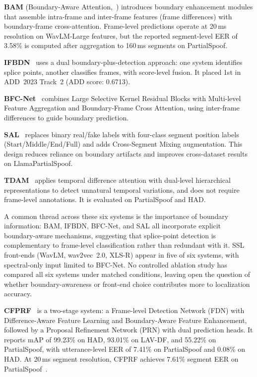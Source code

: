 \documentclass[journal]{IEEEtran}
\begin{document}
\textbf{BAM} (Boundary-Aware Attention,~\cite{zhong2024bam}) introduces boundary enhancement modules that assemble intra-frame and inter-frame features (frame differences) with boundary-frame cross-attention. Frame-level predictions operate at 20\,ms resolution on WavLM-Large features, but the reported segment-level EER of 3.58\% is computed after aggregation to 160\,ms segments on PartialSpoof.

\textbf{IFBDN}~\cite{cai2024ifbdn} uses a dual boundary-plus-detection approach: one system identifies splice points, another classifies frames, with score-level fusion. It placed 1st in ADD~2023 Track~2 (ADD score: 0.6713).

\textbf{BFC-Net}~\cite{zhou2025bfcnet} combines Large Selective Kernel Residual Blocks with Multi-level Feature Aggregation and Boundary-Frame Cross Attention, using inter-frame differences to guide boundary prediction.

\textbf{SAL}~\cite{sal2026} replaces binary real/fake labels with four-class segment position labels (Start/Middle/End/Full) and adds Cross-Segment Mixing augmentation. This design reduces reliance on boundary artifacts and improves cross-dataset results on LlamaPartialSpoof.

\textbf{TDAM}~\cite{li2025tdam} applies temporal difference attention with dual-level hierarchical representations to detect unnatural temporal variations, and does not require frame-level annotations. It is evaluated on PartialSpoof and HAD.

A common thread across these six systems is the importance of boundary information: BAM, IFBDN, BFC-Net, and SAL all incorporate explicit boundary-aware mechanisms, suggesting that splice-point detection is complementary to frame-level classification rather than redundant with it. SSL front-ends (WavLM, wav2vec~2.0, XLS-R) appear in five of six systems, with spectral-only input limited to BFC-Net. No controlled ablation study has compared all six systems under matched conditions, leaving open the question of whether boundary-awareness or front-end choice contributes more to localization accuracy.

\textbf{CFPRF}~\cite{wu2024cfprf} is a two-stage system: a Frame-level Detection Network (FDN) with Difference-Aware Feature Learning and Boundary-Aware Feature Enhancement, followed by a Proposal Refinement Network (PRN) with dual prediction heads. It reports mAP of 99.23\% on HAD, 93.01\% on LAV-DF, and 55.22\% on PartialSpoof, with utterance-level EER of 7.41\% on PartialSpoof and 0.08\% on HAD. At 20\,ms segment resolution, CFPRF achieves 7.61\% segment EER on PartialSpoof~\cite{luong2025metrics}.
\end{document}
